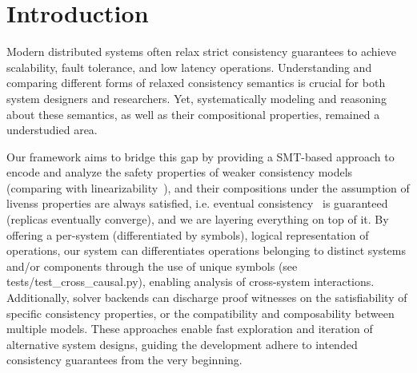 \section{Introduction}

{\color{red}

  Modern distributed systems often relax strict consistency
  guarantees to achieve
  scalability, fault tolerance, and low latency operations. Understanding and
  comparing different forms of relaxed consistency semantics is crucial for both
  system designers and researchers. Yet, systematically modeling and reasoning
  about these semantics, as well as their compositional properties, remained a
  understudied area.

  Our framework aims to bridge this gap by providing a SMT-based approach to
  encode and analyze the safety properties of weaker consistency
  models (comparing
  with linearizability~\cite{herlihy1990linearizability}), and their
  compositions under
  the assumption of livenss properties are always satisfied, i.e. eventual
  consistency~\cite{petersen1997flexible} is guaranteed (replicas
  eventually converge),
  and we are layering everything on top of it. By offering a per-system
  (differentiated by symbols), logical representation of operations, our system
  can differentiates operations belonging to distinct systems and/or components
  through the use of unique symbols (see tests/test\_cross\_causal.py), enabling
  analysis of cross-system interactions. Additionally, solver backends can
  discharge proof witnesses on the satisfiability of specific consistency
  properties, or the compatibility and composability between multiple models.
  These approaches enable fast exploration and iteration of alternative system
  designs, guiding the development adhere to intended consistency
  guarantees from
  the very beginning.

}
